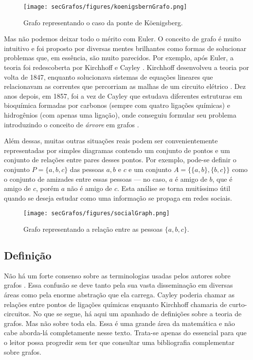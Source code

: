 \begin{figure}[H]
	\begin{center}
		\texttt{[image: secGrafos/figures/koenigsbernGrafo.png]}
	\end{center}
	\caption{Grafo representando o caso da ponte de Köenigsberg.}
	\label{fig:koniGrafo}
\end{figure}

Mas não podemos deixar todo o mérito com Euler. O conceito de grafo é muito intuitivo e foi proposto por diversas mentes brilhantes como formas de solucionar problemas que, em essência, são muito parecidos. Por exemplo, após Euler, a teoria foi redescoberta por Kirchhoff e Cayley \cite{graphTheoryFHarary}. Kirchhoff desenvolveu a teoria por volta de 1847, enquanto solucionava sistemas de equações lineares que relacionavam as correntes que percorriam as malhas de um circuito elétrico \cite{kirchhoff1847ueber}. Dez anos depois, em 1857, foi a vez de Cayley que estudava diferentes estruturas em bioquímica formadas por carbonos (sempre com quatro ligações químicas) e hidrogênios (com apenas uma ligação), onde conseguiu formular seu problema introduzindo o conceito de \textit{árvore} em grafos \cite{cayley1897theory}.  

Além dessas, muitas outras situações reais podem ser convenientemente representadas por simples diagramas contendo um conjunto de pontos e um conjunto de relações entre pares desses pontos. Por exemplo, pode-se definir o conjunto $P = \{a,b,c\}$ das pessoas $a, b$ e $c$ e um conjunto $A = \{\{a,b\}, \{b,c\}\}$ como o conjunto de amizades entre essas pessoas --- no caso, $a$ é amigo de $b$, que é amigo de $c$, porém $a$ não é amigo de $c$. 
Esta análise se torna muitíssimo útil quando se deseja estudar como uma informação se propaga em redes sociais.

\begin{figure}[H]
	\begin{center}
		\texttt{[image: secGrafos/figures/socialGraph.png]}
	\end{center}
	\caption{Grafo representando a relação entre as pessoas $\{a, b, c\}$.}
	\label{fig:socialGraph}
\end{figure}

\subsection{Definição}

Não há um forte consenso sobre as terminologias usadas pelos autores sobre grafos \cite{graphTheoryFHarary}. Essa confusão se deve tanto pela sua vasta disseminação em diversas áreas como pela enorme abstração que ela carrega. Cayley poderia chamar as relações entre pontos de ligações químicas enquanto Kirchhoff chamaria de curto-circuitos.
No que se segue, há aqui um apanhado de definições sobre a teoria de grafos. Mas não sobre toda ela. Essa é uma grande área da matemática e não cabe aborda-lá completamente nesse texto. Trata-se apenas do essencial para que o leitor possa progredir sem ter que consultar uma bibliografia complementar sobre grafos.

